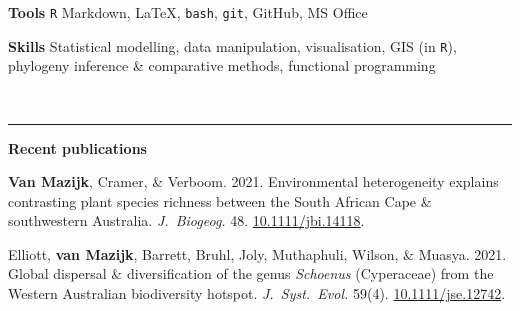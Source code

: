 \documentclass[12pt]{article}
\begin{document}
\textbf{Tools    }     \hfill                            \texttt{R} Markdown,
                                        {\selectfont \LaTeX},
                               \texttt{bash}, \texttt{git}, GitHub, MS Office

\textbf{Skills  }      \hfill Statistical modelling, data manipulation, visualisation, GIS (in \texttt{R}), \\
                       \hfill phylogeny inference \& comparative methods, functional programming

\

\hrule %

\bigskip

\textbf{Recent publications}

\vskip5pt

\textbf{Van Mazijk}, Cramer, \& Verboom. 2021.  Environmental heterogeneity explains contrasting plant species richness between the South African Cape \& southwestern Australia. \textit{J.~Biogeog.} 48. \href{https://doi.org/10.1111/jbi.14118}{10.1111/jbi.14118}.

Elliott, \textbf{van Mazijk}, Barrett, Bruhl, Joly, Muthaphuli, Wilson, \& Muasya. 2021. Global dispersal \& diversification of the genus \textit{Schoenus} (Cyperaceae) from the Western Australian biodiversity hotspot. \textit{J.~Syst.~Evol.} 59(4). \href{https://doi.org/10.1111/jse.1274}{10.1111/jse.12742}.
\end{document}
